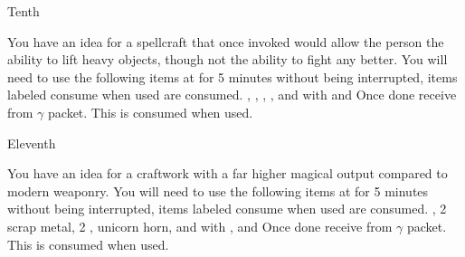 \documentclass[greennotebook]{guildcamp3} %
\begin{document}
\begin{page}{Tenth}
	
	You have an idea for a spellcraft that once invoked would allow the person the ability to lift heavy objects, though not the ability to fight any better.
	You will need to use the following items at \sMageWorkbench{} for 5 minutes without being interrupted, items labeled consume when used are consumed.
	\iWerewolfFang{}, \iBloodPlasma{}, \iPhoenixFeather{}, \iStardust{}, and \iBelladonna{} with \iGlassLens{} and \iClover{}
	Once done receive \iStrengthSpell{} from $\gamma$ packet. This is consumed when used. 
	
\end{page}

\begin{page}{Eleventh}
	
	You have an idea for a craftwork with a far higher magical output compared to modern weaponry.
	You will need to use the following items at \sMageWorkbench{} for 5 minutes without being interrupted, items labeled consume when used are consumed.
	\iDragonSkin{}, 2 scrap metal, 2 \iHolyWater{}, unicorn horn, and \iWerewolfFang{} with \iMortarPestle{}, and \iSieve{}
	Once done receive \iUpgradedMagicGun{} from $\gamma$ packet. This is consumed when used. 
	
\end{page}




\endnotebook
\end{document}
